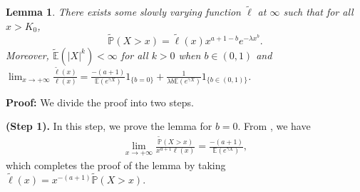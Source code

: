 \documentclass[10pt,a4paper]{amsart}
\newtheorem{lemma}[thrm]{Lemma}
\numberwithin{equation}{section}
\begin{document}
\begin{lemma}\label{lem1}
	There exists some slowly varying function $\widetilde{\ell}$ at $\infty$ such that for all $x>K_0$, 
	\[
		\widetilde{\mathbb{P}}(X>x)=	\widetilde{\ell}(x) x^{a+1-b} e^{-\lambda x^b}.
	\]
	Moreover, $\widetilde{\mathbb{E}}(|X|^k)<\infty$ for all $k>0$ when $b\in (0,1)$ and $\lim_{x\to+\infty} \frac{\widetilde{\ell}(x)}{\ell(x)}= \frac{-(a+1)}{\mathbb{E}(e^{\gamma X})}1_{\{b=0\}}+ \frac{1}{\lambda b \mathbb{E}(e^{\gamma X})}1_{\{b\in (0,1)\}}$.
\end{lemma}
\textbf{Proof: } We divide the proof into two steps.

\noindent
{\bf (Step 1).} In this step, we prove the lemma for $b=0$. From \cite[Proposition 1.5.10, p. 27]{BGT1987}, we have
\begin{align} 
	\lim_{x\to+\infty} \frac{\widetilde{\mathbb{P}}(X>x)}{x^{a+1}\ell(x)}= \frac{-(a+1)}{\mathbb{E}(e^{\gamma X})},
\end{align}
which completes the proof of the lemma by taking $\widetilde{\ell}(x) =x^{-(a+1)}\widetilde{\mathbb{P}}(X>x)$.
\end{document}
